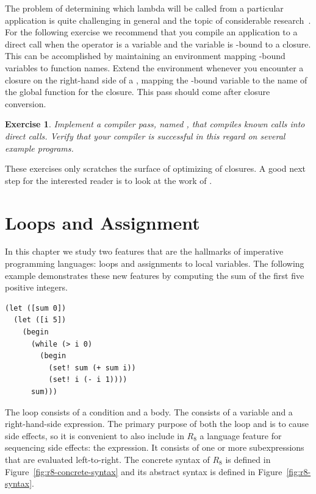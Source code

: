 \documentclass[11pt]{book}
\newtheorem{exercise}[theorem]{Exercise}
\begin{document}
The problem of determining which lambda will be called from a
particular application is quite challenging in general and the topic
of considerable research~\citep{Shivers:1988aa,Gilray:2016aa}. For the
following exercise we recommend that you compile an application to a
direct call when the operator is a variable and the variable is
-bound to a closure. This can be accomplished by maintaining
an environment mapping -bound variables to function names.
Extend the environment whenever you encounter a closure on the
right-hand side of a , mapping the -bound variable
to the name of the global function for the closure.  This pass should
come after closure conversion.

\begin{exercise}\normalfont
Implement a compiler pass, named , that
compiles known calls into direct calls. Verify that your compiler is
successful in this regard on several example programs.
\end{exercise}

These exercises only scratches the surface of optimizing of
closures. A good next step for the interested reader is to look at the
work of \citet{Keep:2012ab}.

\chapter{Loops and Assignment}
\label{ch:loop}

In this chapter we study two features that are the hallmarks of
imperative programming languages: loops and assignments to local
variables. The following example demonstrates these new features by
computing the sum of the first five positive integers.
\begin{lstlisting}
(let ([sum 0])
  (let ([i 5])
    (begin
      (while (> i 0)
        (begin
          (set! sum (+ sum i))
          (set! i (- i 1))))
      sum)))
\end{lstlisting}
The  loop consists of a condition and a body.  
%
The  consists of a variable and a right-hand-side expression.
%
The primary purpose of both the  loop and   is
to cause side effects, so it is convenient to also include in $R_8$ a
language feature for sequencing side effects: the 
expression. It consists of one or more subexpressions that are
evaluated left-to-right.
%
The concrete syntax of $R_8$ is defined in
Figure~\ref{fig:r8-concrete-syntax} and its abstract syntax is defined
in Figure~\ref{fig:r8-syntax}.
\end{document}
